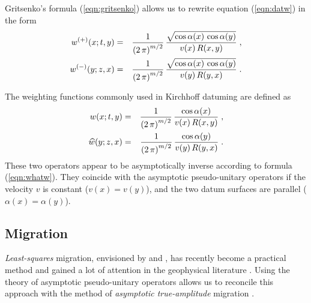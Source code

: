 Gritsenko's formula (\ref{eqn:gritsenko}) allows us to
rewrite equation (\ref{eqn:datw}) in the form \cite[]{goldin}
\begin{eqnarray}
w^{(+)}(x;t,y) & = & {1\over{\left(2\,\pi\right)^{m/2}}} \,
{\sqrt{\cos{\alpha(x)}\,\cos{\alpha(y)}}\over {v(x)\,R(x,y)}}\;,
 \\
w^{(-)}(y;z,x) & = & {1\over{\left(2\,\pi\right)^{m/2}}} \,
{\sqrt{\cos{\alpha(x)}\,\cos{\alpha(y)}}\over {v(y)\,R(y,x)}}\;.
\end{eqnarray}
\par
The weighting functions commonly used in Kirchhoff datuming
\cite[]{GEO44-08-13291344,GEO49-08-12391248,svgdat} are defined as
\begin{eqnarray}
w(x;t,y) & = & {1\over{\left(2\,\pi\right)^{m/2}}} \,
{{\cos{\alpha(x)}}\over {v(x)\,R(x,y)}}\;,
 \\
\widehat{w}(y;z,x) & = & {1\over{\left(2\,\pi\right)^{m/2}}} \,
{{\cos{\alpha(y)}}\over {v(y)\,R(y,x)}}\;.
\label{eqn:datw2}
\end{eqnarray}
These two operators appear to be asymptotically inverse according to
formula (\ref{eqn:whatw}). They coincide with the asymptotic pseudo-unitary
operators if the velocity $v$ is constant ($v(x)=v(y)$), and the two
datum surfaces are parallel ($\alpha(x) = \alpha(y)$).


\subsection{Migration}
\emph{Least-squares} migration, envisioned by \cite{lailly} and 
\cite{taran}, has recently
become a practical method and gained a lot of attention in the
geophysical literature \cite[]{nemeth99,chavent,duquet,resol}. Using the
theory of asymptotic pseudo-unitary operators allows us to reconcile 
this approach with the method of \emph{asymptotic true-amplitude}
migration \cite[]{bleistein}.

